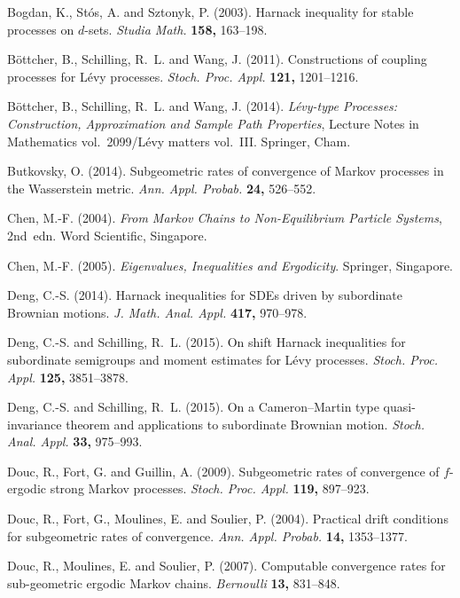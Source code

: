 \documentclass{aptpub}
\numberwithin{equation}{section}
\begin{document}
\begin{thebibliography}{99}
\footnotesize



{\sc Bogdan, K., St\'{o}s, A. and Sztonyk, P.}
(2003). Harnack inequality for stable processes on $d$-sets.
\emph{Studia Math.} {\bf 158,} 163--198.

{\sc B\"{o}ttcher, B., Schilling, R.~L. and Wang, J.}
(2011). Constructions of coupling processes for L\'{e}vy processes.
{\em Stoch. Proc. Appl.} {\bf 121,} 1201--1216.


{\sc B\"{o}ttcher, B., Schilling, R.~L. and Wang, J.} (2014).
{\em L\'evy-type Processes: Construction, Approximation and Sample Path Properties}, Lecture Notes
in Mathematics vol.\ 2099/L\'evy matters vol.\ III. Springer, Cham.


{\sc Butkovsky, O.} (2014). Subgeometric rates of convergence of Markov
processes in the Wasserstein metric.
{\em Ann. Appl. Probab.} {\bf 24,} 526--552.


{\sc Chen, M.-F.} (2004). {\em From Markov Chains to Non-Equilibrium Particle Systems}, 2nd~edn. Word Scientific, Singapore.


{\sc Chen, M.-F.} (2005). {\em Eigenvalues, Inequalities and Ergodicity}. Springer, Singapore.


{\sc Deng, C.-S.} (2014). Harnack inequalities for SDEs driven by subordinate Brownian motions. {\em J. Math. Anal. Appl.}
{\bf 417,} 970--978.

{\sc Deng, C.-S. and Schilling, R.~L.} (2015). On shift Harnack inequalities for subordinate semigroups and moment
estimates for L\'{e}vy processes. {\em Stoch. Proc. Appl.}
{\bf 125,} 3851--3878.

{\sc Deng, C.-S. and Schilling, R.~L.} (2015). On a Cameron--Martin type quasi-invariance theorem and applications to subordinate
Brownian motion. {\em Stoch. Anal. Appl.}
{\bf 33,} 975--993.

{\sc Douc, R., Fort, G. and Guillin, A.} (2009). Subgeometric rates of convergence of $f$-ergodic strong Markov processes. {\em Stoch. Proc. Appl.} {\bf 119,} 897--923.

{\sc Douc, R., Fort, G., Moulines, E. and Soulier, P.} (2004).
Practical drift conditions for subgeometric rates of convergence.
{\em Ann. Appl. Probab.} {\bf 14,} 1353--1377.

{\sc Douc, R., Moulines, E. and Soulier, P.} (2007).
Computable convergence rates for sub-geometric ergodic Markov chains.
{\em Bernoulli} {\bf 13,} 831--848.


\end{thebibliography}
\end{document}
